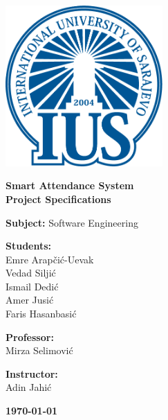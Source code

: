 \documentclass[a4paper, 12pt]{article}
\title{}
\author{}
\date{}
\begin{document}
  
  \begin{titlepage}
    \begin{center}
        \includegraphics[width=0.45\textwidth]{../GlobalImages/Logo.png} %
        \vspace{1.5cm}

        {\Huge \textbf{Smart Attendance System}}\\
        \vspace{0.5cm}
        {\Large \textbf{Project Specifications}}\\
        
        \vspace{2cm}
        
        {\large \textbf{Subject:} Software Engineering}\\
        
        \vspace{2cm}
        
        \begin{minipage}[t]{0.48\textwidth}
          \textbf{Students:}\\
          {\large Emre Arapčić-Uevak}\\
          {\large Vedad Siljić}\\
          {\large Ismail Dedić}\\
          {\large Amer Jusić}\\
          {\large Faris Hasanbasić}\\
        \end{minipage}
        \hfill
        \begin{minipage}[t]{0.48\textwidth}
          \raggedleft
          \textbf{Professor:} \\
          {\large Mirza Selimović}\\
          
          \vspace{1cm}

          \textbf{Instructor:} \\
          {\large Adin Jahić}\\
        \end{minipage}


        
        \vfill  %
        
        \textbf{\today}  %
        
    \end{center}
  \end{titlepage}
\end{document}

